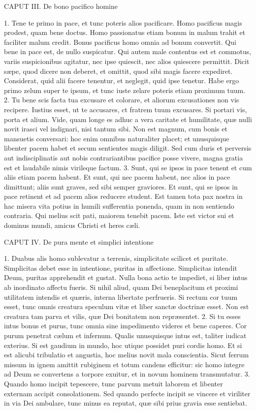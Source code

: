 \documentclass[twoside]{article}
\begin{document}
CAPUT III.
De bono pacifico homine

1. Tene te primo in pace, et tunc poteris alios pacificare. Homo pacificus magis prodest, quam bene doctus. Homo passionatus etiam bonum in malum trahit et faciliter malum credit. Bonus pacificus homo omnia ad bonum convertit. Qui bene in pace est, de nullo suspicatur. Qui autem male contentus est et commotus, variis suspicionibus agitatur, nec ipse quiescit, nec alios quiescere permittit. Dicit sæpe, quod dicere non deberet, et omittit, quod sibi magis facere expediret. Considerat, quid alii facere tenentur, et neglegit, quid ipse tenetur. Habe ergo primo zelum super te ipsum, et tunc iuste zelare poteris etiam proximum tuum.
2. Tu bene scis facta tua excusare et colorare, et aliorum excusationes non vis recipere. Iustius esset, ut te accusares, ct fratrem tuum excusares. Si portari vis, porta et alium. Vide, quam longe es adhuc a vera caritate et humilitate, quæ nulli novit irasci vel indignari, nisi tantum sibi. Non est magnum, cum bonis et mansuetis conversari: hoc enim omnibus naturaliter placet; et unusquisque libenter pacem habet et secum sentientes magis diligit. Sed cum duris et perversis aut indisciplinatis aut nobis contrariantibus pacifice posse vivere, magna gratia est et laudabile nimis virileque factum.
3. Sunt, qui se ipsos in pace tenent et cum aliis etiam pacem habent. Et sunt, qui nec pacem habent, nec alios in pace dimittunt; aliis sunt graves, sed sibi semper graviores. Et sunt, qui se ipsos in pace retinent et ad pacem alios reducere student. Est tamen tota pax nostra in hac misera vita potius in humili sufferentia ponenda, quam in non sentiendo contraria. Qui melius scit pati, maiorem tenebit pacem. Iste est victor sui et dominus mundi, amicus Christi et heres cæli.


CAPUT IV.
De pura mente et simplici intentione

1. Duabus alis homo sublevatur a terrenis, simplicitate scilicet et puritate. Simplicitas debet esse in intentione, puritas in affectione. Simplicitas intendit Deum, puritas apprehendit et gustat. Nulla bona actio te impediet, si liber intus ab inordinato affectu fueris. Si nihil aliud, quam Dei beneplacitum et proximi utilitatem intendis et quæris, interna libertate perfrueris. Si rectum cor tuum esset, tunc omnis creatura speculum vitæ et liber sanctæ doctrinæ esset. Non est creatura tam parva et vilis, quæ Dei bonitatem non repræsentet.
2. Si tu esses intus bonus et purus, tunc omnia sine impedimento videres et bene caperes. Cor purum penetrat cælum et infernum. Qualis unusquisque intus est, taliter iudicat exterius. Si est gaudium in mundo, hoc utique possidet puri cordis homo. Et si est alicubi tribulatio et angustia, hoc melius novit mala conscientia. Sicut ferrum missum in ignem amittit rubiginem et totum candens efficitur: sic homo integre ad Deum se convertens a torpore exuitur, et in novum hominem transmutatur.
3. Quando homo incipit tepescere, tunc parvum metuit laborem et libenter externam accipit consolationem. Sed quando perfecte incipit se vincere et viriliter in via Dei ambulare, tunc minus ea reputat, quæ sibi prius gravia esse sentiebat.
\end{document}

